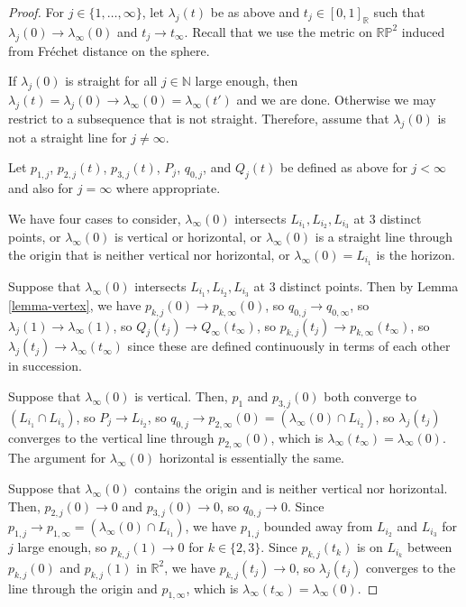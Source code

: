 \documentclass[JEP,XML,SOM,Unicode,NoFloatCountersInSection,published]{cedram}
\theoremstyle{remark}
\let\mb\mathbb
\newcommand{\projplane}{\mb{RP}^2}
\begin{document}
\begin{proof}
For $j \in \{1,\dots,\infty\}$, let $\lambda_j(t)$ be as above and $t_j \in [0,1]_\mb{R}$ such that $\lambda_j(0) \to \lambda_\infty(0)$ and $t_j \to t_\infty$.
Recall that we use the metric on $\projplane$ induced from Fréchet distance on the sphere.

If $\lambda_j(0)$ is straight for all $j \in \mb{N}$ large enough, then $\lambda_j(t) = \lambda_j(0) \to \lambda_\infty(0) = \lambda_\infty(t')$ and we are done.
Otherwise we may restrict to a subsequence that is not straight.
Therefore, assume that $\lambda_j(0)$ is not a straight line for $j\neq \infty$.

Let $p_{1,j}$, $p_{2,j}(t)$, $p_{3,j}(t)$, $P_j$, $q_{0,j}$, and $Q_{j}(t)$ be defined as above for $j < \infty$ and also for $j=\infty$ where appropriate.

We have four cases to consider, $\lambda_\infty(0)$ intersects $L_{i_1},L_{i_2},L_{i_3}$ at $3$ distinct points, or $\lambda_\infty(0)$ is vertical or horizontal, or $\lambda_\infty(0)$ is a straight line through the origin that is neither vertical nor horizontal, or $\lambda_\infty(0) = L_{i_1}$ is the horizon.

Suppose that $\lambda_\infty(0)$ intersects $L_{i_1},L_{i_2},L_{i_3}$ at $3$ distinct points. Then by Lemma \ref{lemma-vertex}, we have $p_{k,j}(0) \to p_{k,\infty}(0)$, so $q_{0,j} \to q_{0,\infty}$, so $\lambda_j(1) \to \lambda_\infty(1)$, so $Q_{j}(t_j) \to Q_{\infty}(t_\infty)$, so $p_{k,j}(t_j) \to p_{k,\infty}(t_\infty)$, so $\lambda_j(t_j) \to \lambda_\infty(t_\infty)$ since these are defined continuously in terms of each other in succession.

Suppose that $\lambda_\infty(0)$ is vertical. Then, $p_1$ and $p_{3,j}(0)$ both converge to $(L_{i_1} \cap L_{i_3})$, so $P_j \to L_{i_2}$, so $q_{0,j} \to p_{2,\infty}(0) = (\lambda_\infty(0) \cap L_{i_2})$, so $\lambda_j(t_j)$ converges to the vertical line through $p_{2,\infty}(0)$, which is $\lambda_\infty(t_\infty) = \lambda_\infty(0)$.
The argument for $\lambda_\infty(0)$ horizontal is essentially the same.

Suppose that $\lambda_\infty(0)$ contains the origin and is neither vertical nor horizontal. Then, $p_{2,j}(0) \to 0$ and $p_{3,j}(0) \to 0$, so $q_{0,j} \to 0$. Since $p_{1,j} \to p_{1,\infty} = (\lambda_\infty(0) \cap L_{i_1})$, we have $p_{1,j}$ bounded away from $L_{i_2}$ and $L_{i_3}$ for $j$ large enough, so $p_{k,j}(1) \to 0$ for $k \in \{2,3\}$. Since $p_{k,j}(t_k)$ is on $L_{i_k}$ between $p_{k,j}(0)$ and $p_{k,j}(1)$ in $\mb{R}^2$, we have $p_{k,j}(t_j) \to 0$, so $\lambda_j(t_j)$ converges to the line through the origin and $p_{1,\infty}$, which is $\lambda_\infty(t_\infty) = \lambda_\infty(0)$.


\end{proof}
\end{document}
